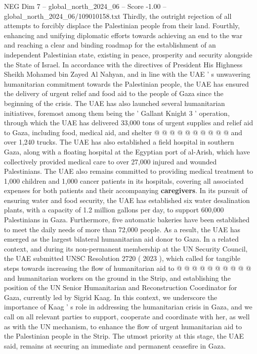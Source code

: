 \begin{textsample}{NEG Dim 7 – global\_north\_2024\_06 – Score -1.00 – global\_north\_2024\_06/109010158.txt}
Thirdly, the outright rejection of all attempts to forcibly displace the Palestinian people from their land.
Fourthly, enhancing and unifying diplomatic efforts towards achieving an end to the war and reaching a clear and binding roadmap for the establishment of an independent Palestinian state, existing in peace, prosperity and security alongside the State of Israel.
In accordance with the directives of President His Highness Sheikh Mohamed bin Zayed Al Nahyan, and in line with the UAE ' s unwavering humanitarian commitment towards the Palestinian people, the UAE has ensured the delivery of urgent relief and food aid to the people of Gaza since the beginning of the crisis.
The UAE has also launched several humanitarian initiatives, foremost among them being the ' Gallant Knight 3 ' operation, through which the UAE has delivered 33,000 tons of urgent supplies and relief aid to Gaza, including food, medical aid, and shelter @ @ @ @ @ @ @ @ @ @ and over 1,240 trucks.
The UAE has also established a field hospital in southern Gaza, along with a floating hospital at the Egyptian port of al-Arish, which have collectively provided medical care to over 27,000 injured and wounded Palestinians.
The UAE also remains committed to providing medical treatment to 1,000 children and 1,000 cancer patients in its hospitals, covering all associated expenses for both patients and their accompanying \textbf{caregivers}.
In its pursuit of ensuring water and food security, the UAE has established six water desalination plants, with a capacity of 1.2 million gallons per day, to support 600,000 Palestinians in Gaza.
Furthermore, five automatic bakeries have been established to meet the daily needs of more than 72,000 people.
As a result, the UAE has emerged as the largest bilateral humanitarian aid donor to Gaza.
In a related context, and during its non-permanent membership at the UN Security Council, the UAE submitted UNSC Resolution 2720 ( 2023 ), which called for tangible steps towards increasing the flow of humanitarian aid to @ @ @ @ @ @ @ @ @ @ and humanitarian workers on the ground in the Strip, and establishing the position of the UN Senior Humanitarian and Reconstruction Coordinator for Gaza, currently led by Sigrid Kaag.
In this context, we underscore the importance of Kaag ' s role in addressing the humanitarian crisis in Gaza, and we call on all relevant parties to support, cooperate and coordinate with her, as well as with the UN mechanism, to enhance the flow of urgent humanitarian aid to the Palestinian people in the Strip.
The utmost priority at this stage, the UAE said, remains at securing an immediate and permanent ceasefire in Gaza.

\end{textsample}
